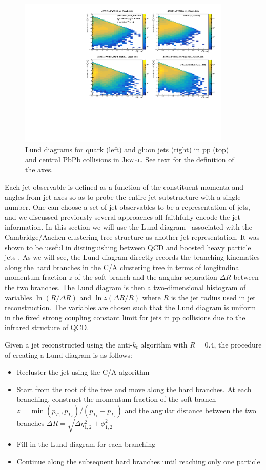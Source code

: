 \documentclass[notoc]{JHEP3}
\begin{document}
\begin{figure}[t]
	\centering
	\includegraphics[width=0.9\textwidth]{plots/Individual_LundDiagrams_zrel.pdf}
	\caption{Lund diagrams for quark (left) and gluon jets (right) in pp (top) and central PbPb collisions in \textsc{Jewel}. See text for the definition of the axes.}
\label{fig:Lund_full}
\end{figure}

Each jet observable is defined as a function of the constituent momenta and angles from jet axes so as to probe the entire jet substructure with a single number. One can choose a set of jet observables to be a representation of jets, and we discussed previously several approaches all faithfully encode the jet information. In this section we will use the Lund diagram~\cite{Andersson1989} associated with the Cambridge/Aachen clustering tree structure as another jet representation. It was shown to be useful in distinguishing between QCD and boosted heavy particle jets \cite{Salam:2016yht}. As we will see, the Lund diagram directly records the branching kinematics along the hard branches in the C/A clustering tree in terms of longitudinal momentum fraction $z$ of the soft branch and the angular separation $\Delta R$ between the two branches. The Lund diagram is then a two-dimensional histogram of variables $\ln (R/\Delta R)$ and $\ln z(\Delta R/R)$ where $R$ is the jet radius used in jet reconstruction. The variables are chosen such that the Lund diagram is uniform in the fixed strong coupling constant limit for jets in pp collisions due to the infrared structure of QCD.

Given a jet reconstructed using the anti-$k_{t}$ algorithm with $R = 0.4$, the procedure of creating a Lund diagram is as follows:
\begin{itemize}
	\item Recluster the jet using the C/A algorithm
	\item Start from the root of the tree and move along the hard branches. At each branching, construct the momentum fraction of the soft branch $z=\min(p_{T_1},p_{T_2})/(p_{T_1}+p_{T_2})$ and the angular distance between the two branches $\Delta R = \sqrt{\Delta \eta^2_{1, 2}+\phi^2_{1, 2}}$
	\item Fill in the Lund diagram for each branching
	\item Continue along the subsequent hard branches until reaching only one particle
\end{itemize}
\end{document}
